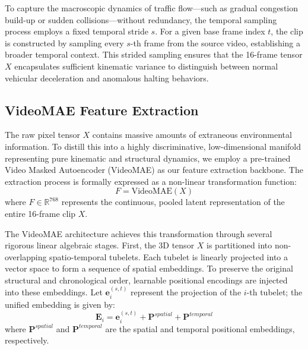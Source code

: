 \documentclass[conference]{IEEEtran}
\begin{document}
To capture the macroscopic dynamics of traffic flow—such as gradual congestion build-up or sudden collisions—without redundancy, the temporal sampling process employs a fixed temporal stride $s$. For a given base frame index $t$, the clip is constructed by sampling every $s$-th frame from the source video, establishing a broader temporal context. This strided sampling ensures that the 16-frame tensor $X$ encapsulates sufficient kinematic variance to distinguish between normal vehicular deceleration and anomalous halting behaviors.

\subsection{VideoMAE Feature Extraction}
\label{subsec:videomae_extraction}

The raw pixel tensor $X$ contains massive amounts of extraneous environmental information. To distill this into a highly discriminative, low-dimensional manifold representing pure kinematic and structural dynamics, we employ a pre-trained Video Masked Autoencoder (VideoMAE) as our feature extraction backbone. The extraction process is formally expressed as a non-linear transformation function:
\begin{equation}
F = \text{VideoMAE}(X)
\label{eq:videomae_extraction}
\end{equation}
where $F \in \mathbb{R}^{768}$ represents the continuous, pooled latent representation of the entire 16-frame clip $X$.

The VideoMAE architecture achieves this transformation through several rigorous linear algebraic stages. First, the 3D tensor $X$ is partitioned into non-overlapping spatio-temporal tubelets. Each tubelet is linearly projected into a vector space to form a sequence of spatial embeddings. To preserve the original structural and chronological order, learnable positional encodings are injected into these embeddings. Let $\mathbf{e}^{(s,t)}_i$ represent the projection of the $i$-th tubelet; the unified embedding is given by:
\begin{equation}
\mathbf{E}_i = \mathbf{e}^{(s,t)}_i + \mathbf{P}^{spatial} + \mathbf{P}^{temporal}
\label{eq:embeddings}
\end{equation}
where $\mathbf{P}^{spatial}$ and $\mathbf{P}^{temporal}$ are the spatial and temporal positional embeddings, respectively.
\end{document}
